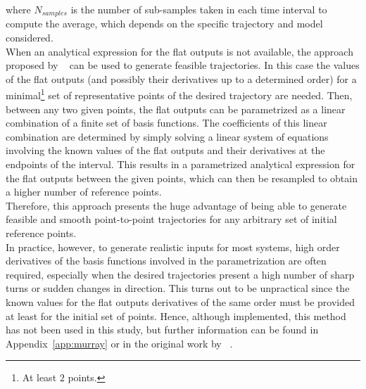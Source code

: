 \documentclass[../main.tex]{subfiles}
\begin{document}
where $N_{samples}$ is the number of sub-samples taken in each time interval to
compute the average, which depends on the specific trajectory and model considered.\\
When an analytical expression for the flat outputs is not available, the
approach proposed by ~\cite{murray} can be used to generate feasible
trajectories. In this case the values of the flat outputs (and possibly their
derivatives up to a determined order) for a minimal\footnote{At least $2$
points.} set of representative points of the desired trajectory are needed.
Then, between any two given points, the flat outputs can be parametrized as a
linear combination of a finite set of basis functions. The coefficients of this
linear combination are determined by simply solving a linear system of equations
involving the known values of the flat outputs and their derivatives at the
endpoints of the interval. This results in a parametrized analytical expression
for the flat outputs between the given points, which can then be resampled to
obtain a higher number of reference points.\\
Therefore, this approach presents the huge advantage of being able to generate
feasible and smooth point-to-point trajectories for any arbitrary set of initial
reference points.\\
In practice, however, to generate realistic inputs for most systems, high order
derivatives of the basis functions involved in the parametrization are often required,
especially when the desired trajectories present a high number of sharp turns
or sudden changes in direction. This turns out to be unpractical since the known
values for the flat outputs derivatives of the same order must be provided at
least for the initial set of points. Hence, although implemented, this method
has not been used in this study, but further information can be found in
Appendix~\ref{app:murray} or in the original work by
~\cite{murray}.
\end{document}
